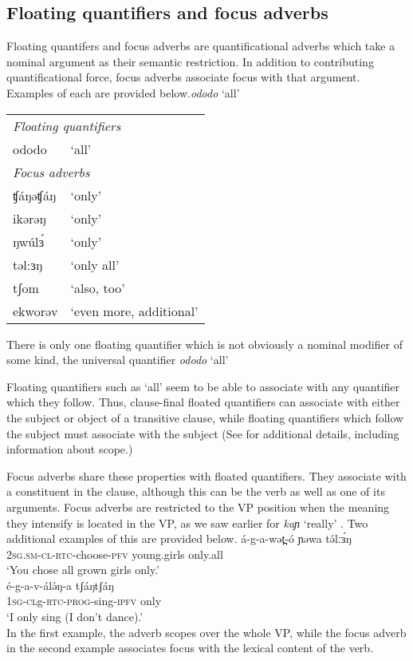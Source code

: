 %

\subsection{Floating quantifiers and focus adverbs}\label{sec:ch13:focus}

Floating quantifers and focus adverbs are quantificational adverbs which take a nominal argument as their semantic restriction. In addition to contributing quantificational force, focus adverbs associate focus with that argument. Examples of each are provided below.\textit{ododo} `all' 
\begin{tabular}{ll}
\multicolumn{2}{l}{\textit{Floating quantifiers}} \\
ododo & `all' \\
\multicolumn{2}{l}{\textit{Focus adverbs}} \\
ʧáŋəʧáŋ		&	‘only’\\
ikərəŋ		&	‘only’\\
ŋwúlɜ́		&	‘only’\\
təl:ɜŋ		&	‘only all’\\
tʃom		&	‘also, too’\\
ekworəv		&	‘even more, additional’\\
\end{tabular}
 There is only one floating quantifier which is not obviously a nominal modifier of some kind, the universal quantifier \textit{ododo} `all'
 
Floating quantifiers such as `all' seem to be able to associate with any quantifier which they follow. Thus, clause-final floated quantifiers can associate with either the subject or object of a transitive clause, while floating quantifiers which follow the subject must associate with the subject (See  for additional details, including information about scope.)

Focus adverbs share these properties with floated quantifiers. They associate with a constituent in the clause, although this can be the verb as well as one of its arguments.  Focus adverbs are restricted to the VP position when the meaning they intensify is located in the VP, as we saw earlier for \textit{kaɲ} `really' . Two additional examples of this are provided below.
\ea
\gll á-g-a-wət̪-ó 	ɲəwa 	tə́lːɜ́ŋ\\
2\textsc{sg.sm-cl-rtc}-choose-\textsc{pfv}  young.girls  only.all\\
\glt `You chose all grown girls only.’\\
\ex
\gll é-g-a-v-álə́ŋ-a 	tʃáŋtʃáŋ	\\
1\textsc{sg-cl}g-\textsc{rtc-prog}-sing-\textsc{ipfv}	only	\\
\glt ‘I only sing (I don’t dance).’\\
\z 
In the first example, the adverb scopes over the whole VP, while the focus adverb in the second example associates focus with the lexical content of the verb.

